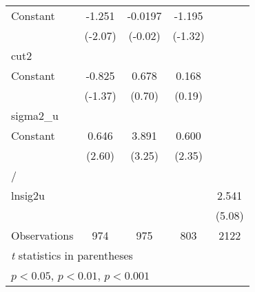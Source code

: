{\begin{longtable}{l*{4}{c}}
Constant        &   -1.251\sym{*}  &  -0.0197         &   -1.195         &                  \\
                &  (-2.07)         &  (-0.02)         &  (-1.32)         &                  \\
\hline
cut2            &                  &                  &                  &                  \\
Constant        &   -0.825         &    0.678         &    0.168         &                  \\
                &  (-1.37)         &   (0.70)         &   (0.19)         &                  \\
\hline
sigma2\_u        &                  &                  &                  &                  \\
Constant        &    0.646\sym{**} &    3.891\sym{**} &    0.600\sym{*}  &                  \\
                &   (2.60)         &   (3.25)         &   (2.35)         &                  \\
\hline
/               &                  &                  &                  &                  \\
lnsig2u         &                  &                  &                  &    2.541\sym{***}\\
                &                  &                  &                  &   (5.08)         \\
\hline
Observations    &      974         &      975         &      803         &     2122         \\
\hline\hline
\multicolumn{5}{l}{\footnotesize \textit{t} statistics in parentheses}\\
\multicolumn{5}{l}{\footnotesize \sym{*} \(p<0.05\), \sym{**} \(p<0.01\), \sym{***} \(p<0.001\)}\\
\end{longtable}
}
